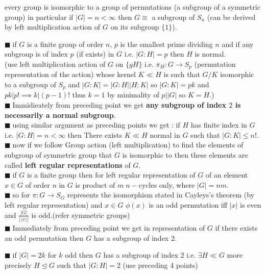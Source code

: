 \documentclass[11pt]{extarticle}
\newcommand{\ra}{\rightarrow}
\newcommand{\snote}[1]{{\footnotesize(#1)}}
\newcommand{\y}{$\blacksquare\;$}
\newcommand{\gen}[1]{\langle #1 \rangle}
\newcommand{\tbx}[2][]{
	\begin{tcolorbox}[enhanced,breakable,size=small,colback=black!2!white,title={#1},arc is angular, arc=1.5mm,drop fuzzy shadow]
		#2
	\end{tcolorbox}
}
\begin{document}
\begin{multicols}{2}
	\tbx[\textbf{ Cayley's Theorem} ]{every group is isomorphic to a group of permutations (a subgroup
		of a symmetric group)  in particular if $ |G|=n<\infty $  then $ G\cong $ a subgroup of $ S_n $
		\snote{can be derived by left multiplication action of $ G $ on its subgroup $ \{1\} $}.
	}
	
	\tbx[Consequences of Cayley's theorem]{ 
			\y    if   $ G $ is a finite group of order $ n $, $ p $ is the smallest prime dividing $ n $ and if any subgroup is of 	index $ p $ (if exists) in $ G $ i.e. $ |G:H|=p $ then $ H $ is normal. \\
			\snote{use  left multiplication action of $ G $ on $ \{gH\} $ i.e. $ \pi_H : G\ra S_p $ (permutation representation of the action) whose kernel $ K\ll H $ is such that $ G/K $ isomorphic to a subgroup of $ S_p $ and $|G:K|=|G:H||H:K|  $ so $ |G:K|=pk $ and $ pk|p!\implies k|(p-1)! $ thus $ k=1 $ by minimality of $ p||G| $ so $ K=H $.}\\
			\y Immidieately from preceding point we get \textbf{any subgroup of index $ 2 $ is necessarily a normal subgroup}. \\
			\y  using similar argument as preceding points we get : if $ H $ has finite index in $ G $ i.e. $ |G:H|=n<\infty $ then  
			There exists $ K\ll H $ normal in $ G $ such that $ |G:K|\leq n! .$\\
			\y now if we follow Group action (left multiplication) to find the elements of subgroup of symmetric group that $ G $ is isomorphic to then these elements are called \textbf{left regular representations} of $ G $. \\
			\y  if $ G $ is a finite group then for left regular representation of $ G $ of an element $ x\in G $ of order $ n $ in $ G $ is product of $ m \; n- $cycles only, where $ |G|=nm .$  \\
			\y so for $ \pi:G\ra S_G$ represents the isomorphism stated in Cayleys's theorem (by left regular representation)  and  $ x\in G $ $ \phi(x) $ is an odd permutation iff $ |x| $ is even and $ \frac{ |G| }{|\gen{x}|}  $ is odd.\snote{refer symmetric groups}\\
			\y Immediately  from preceding point we get in representation of $ G $ if there exists an odd permutation then $ G $ has a subgroup of index $ 2.$ }
			
			\tbx{
			\y  if $|G|=2k $ for $ k $ odd then $ G $ has a subgroup of index $ 2 $ i.e. $ \exists H\ll G $ more precisely $ H\trianglelefteq G $ such that $ |G:H|=2 $ ({\footnotesize use preceding 4 points)} 
	}
	

\end{multicols}
\end{document}
